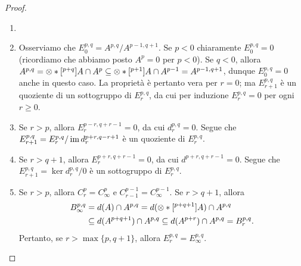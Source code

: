 \begin{proof}
\leavevmode
\begin{enumerate}
\item {}
\item Osserviamo che $E^{p,q}_0=A^{p,q}/A^{p-1,q+1}$. Se $p<0$ chiaramente $E^{p,q}_0=0$ (ricordiamo che abbiamo posto $A^p=0$ per $p<0$). Se $q<0$, allora $A^{p,q}=\pre{p+q}{A}\cap A^p\subs\pre{p+1}{A}\cap A^{p-1}=A^{p-1,q+1}$, dunque $E^{p,q}_0=0$ anche in questo caso. La proprietà è pertanto vera per $r=0$; ma $E^{p,q}_{r+1}$ è un quoziente di un sottogruppo di $E^{p,q}_r$, da cui per induzione $E^{p,q}_r=0$ per ogni $r\ge 0$.
\item Se $r>p$, allora $E^{p-r,q+r-1}_r=0$, da cui $d^{p,q}_r=0$. Segue che $E^{p,q}_{r+1}=E^{p,q}_r/\operatorname{im} d^{p+r,q-r+1}_r$ è un quoziente di $E^{p,q}_r$.
\item Se $r>q+1$, allora $E^{p+r,q+r-1}_r=0$, da cui $d^{p+r,q+r-1}=0$. Segue che $E^{p,q}_{r+1}=\ker d^{p,q}_r/0$ è un sottogruppo di $E^{p,q}_r$.
\item Se $r>p$, allora $C^p_r=C^p_\infty$ e $C^{p-1}_{r-1}=C^{p-1}_\infty$. Se $r>q+1$, allora
\begin{align*}
B^{p,q}_\infty&=d(A)\cap A^{p,q}=d(\pre{p+q+1}{A})\cap A^{p,q}\\
&\subs d(A^{p+q+1})\cap A^{p,q}\subs d(A^{p+r})\cap A^{p,q}=B^{p,q}_r.
\end{align*}
Pertanto, se $r>\max\{p,q+1\}$, allora $E^{p,q}_r=E^{p,q}_\infty$.
\end{enumerate}
\end{proof}